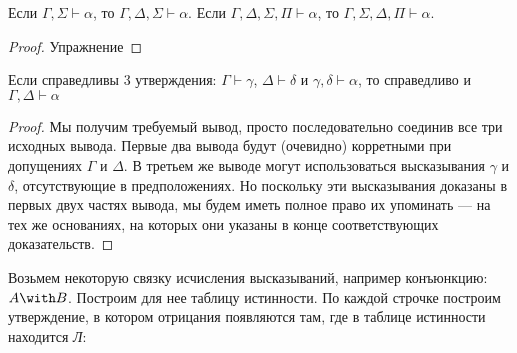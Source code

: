 \begin{lemma}\label{prefix_transposition}
Если $\Gamma, \Sigma \vdash \alpha$, то $\Gamma, \Delta, \Sigma \vdash \alpha$. 
Если $\Gamma, \Delta, \Sigma, \Pi \vdash \alpha$, то $\Gamma, \Sigma, \Delta, \Pi \vdash \alpha$. 
\end{lemma}

\begin{proof}Упражнение\end{proof}

\begin{lemma}
Если справедливы 3 утверждения: $\Gamma \vdash \gamma$, $\Delta \vdash \delta$ и
$\gamma, \delta \vdash \alpha$, то справедливо и $\Gamma, \Delta \vdash \alpha$
\end{lemma}

\begin{proof}

Мы получим требуемый вывод, просто последовательно соединив все три исходных 
вывода. Первые два вывода будут (очевидно) корретными при допущениях $\Gamma$ 
и $\Delta$. В третьем же выводе могут использоваться высказывания $\gamma$ и $\delta$,
отсутствующие в предположениях.
Но поскольку эти высказывания доказаны в первых двух частях вывода, мы будем
иметь полное право их упоминать --- на тех же основаниях, на которых они указаны
в конце соответствующих доказательств.

%

\end{proof}

Возьмем некоторую связку исчисления высказываний, например конъюнкцию: $A \with B$.
Построим для нее таблицу истинности. По каждой строчке построим утверждение,
в котором отрицания появляются там, где в таблице истинности находится \emph{Л}:

